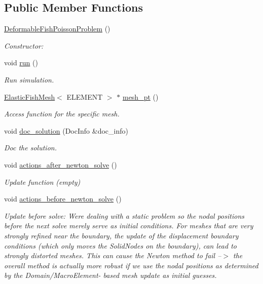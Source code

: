 \subsection*{Public Member Functions}
\begin{DoxyCompactItemize}
\item 
\hyperlink{classDeformableFishPoissonProblem_a383952a668f3cec16b85c6b35f437ddd}{Deformable\+Fish\+Poisson\+Problem} ()
\begin{DoxyCompactList}\small\item\em Constructor\+: \end{DoxyCompactList}\item 
void \hyperlink{classDeformableFishPoissonProblem_a0ef0e4ab464ab41a6f0b7e8a74a9c8a5}{run} ()
\begin{DoxyCompactList}\small\item\em Run simulation. \end{DoxyCompactList}\item 
\hyperlink{classElasticFishMesh}{Elastic\+Fish\+Mesh}$<$ E\+L\+E\+M\+E\+NT $>$ $\ast$ \hyperlink{classDeformableFishPoissonProblem_a5d392625fca2a9d2848205d1e0d016a8}{mesh\+\_\+pt} ()
\begin{DoxyCompactList}\small\item\em Access function for the specific mesh. \end{DoxyCompactList}\item 
void \hyperlink{classDeformableFishPoissonProblem_aee9b59f35d1ae98cda29fba0c01b226a}{doc\+\_\+solution} (Doc\+Info \&doc\+\_\+info)
\begin{DoxyCompactList}\small\item\em Doc the solution. \end{DoxyCompactList}\item 
void \hyperlink{classDeformableFishPoissonProblem_a18fdfaadd9ae10257088b9533f139182}{actions\+\_\+after\+\_\+newton\+\_\+solve} ()
\begin{DoxyCompactList}\small\item\em Update function (empty) \end{DoxyCompactList}\item 
void \hyperlink{classDeformableFishPoissonProblem_ad9d03c8349a059430f7329354033b450}{actions\+\_\+before\+\_\+newton\+\_\+solve} ()
\begin{DoxyCompactList}\small\item\em Update before solve\+: We\textquotesingle{}re dealing with a static problem so the nodal positions before the next solve merely serve as initial conditions. For meshes that are very strongly refined near the boundary, the update of the displacement boundary conditions (which only moves the Solid\+Nodes {\itshape on} the boundary), can lead to strongly distorted meshes. This can cause the Newton method to fail --$>$ the overall method is actually more robust if we use the nodal positions as determined by the Domain/\+Macro\+Element-\/ based mesh update as initial guesses. \end{DoxyCompactList}\item 

\end{DoxyCompactItemize}
